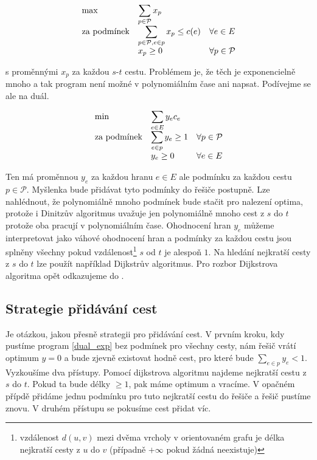 \documentclass{article}
\theoremstyle{plain}
\theoremstyle{definition}
\begin{document}
\begin{equation}\label{exp_lp}
\begin{array}{ll@{}ll}
\text{max} & \displaystyle\sum_{p\in\mathcal{P}}x_p  &\\
\text{za podmínek}& \displaystyle\sum_{p\in\mathcal{P},e\in p} x_p \leq c(e)  & & \forall e \in E\\
& x_p\geq 0 & & \forall p \in \mathcal{P}
\end{array}
\end{equation}

s proměnnými $x_p$ za každou $s$-$t$ cestu. Problémem je, že těch je exponencielně mnoho a tak program není možné v polynomiálním čase ani napsat. Podívejme se ale na duál.

\begin{equation}\label{dual_exp}
\begin{array}{ll@{}ll}
\text{min} & \displaystyle\sum_{e\in E}y_ec_e &\\
\text{za podmínek}& \displaystyle \sum_{e\in p}y_e \geq 1 & & \forall p\in\mathcal{P}\\
&y_e \geq 0& & \forall e \in E
\end{array}
\end{equation}

Ten má proměnnou $y_e$ za každou hranu $e\in E$ ale podmínku za každou cestu $p\in \mathcal{P}$. Myšlenka bude přidávat tyto podmínky do řešiče postupně. Lze nahlédnout, že polynomiálně mnoho podmínek bude stačit pro nalezení optima, protože i Dinitzův algoritmus uvažuje jen polynomiálně mnoho cest z $s$ do $t$ protože oba pracují v polynomiálním čase. Ohodnocení hran $y_e$ můžeme interpretovat jako váhové ohodnocení hran a podmínky za každou cestu jsou splněny všechny pokud vzdálenost\footnote{vzdálenost $d(u,v)$ mezi dvěma vrcholy v orientovaném grafu je délka nejkratší cesty z $u$ do $v$ (případně $+\infty$ pokud žádná neexistuje)} $s$ od $t$ je alespoň $1$. Na hledání nejkratší cesty z $s$ do $t$ lze použít například Dijkstrův algoritmus. Pro rozbor Dijkstrova algoritma opět odkazujeme do \cite{labyrint}.


\subsection{Strategie přidávání cest}
Je otázkou, jakou přesně strategii pro přidávání cest. V prvním kroku, kdy pustíme program \ref{dual_exp} bez podmínek pro všechny cesty, nám řešič vrátí optimum $y=0$ a bude zjevně existovat hodně cest, pro které bude $\sum_{e\in p}y_e<1$. Vyzkoušíme dva přístupy. Pomocí dijkstrova algoritmu najdeme nejkratší cestu z $s$ do $t$. Pokud ta bude délky $\geq 1$, pak máme optimum a vracíme. V opačném přípdě přidáme jednu podmínku pro tuto nejkratší cestu do řešiče a řešič pustíme znovu. V druhém přístupu se pokusíme cest přidat víc. 
\end{document}
